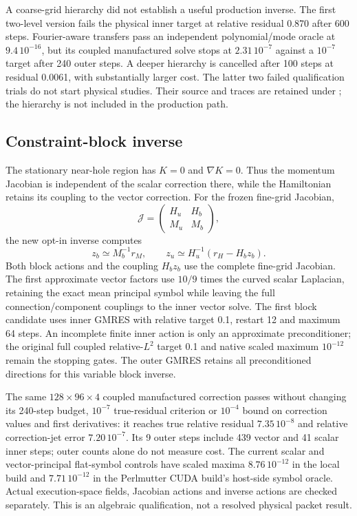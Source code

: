 \documentclass[aps,prd,preprint,notitlepage,nofootinbib]{revtex4-2}
\begin{document}
A coarse-grid hierarchy did not establish a useful production inverse.
The first two-level version fails the physical inner target at relative
residual 0.870 after 600 steps. Fourier-aware transfers pass an independent
polynomial/mode oracle at $9.4\,10^{-16}$, but its coupled manufactured
solve stops at $2.31\,10^{-7}$ against a $10^{-7}$ target after 240 outer
steps. A deeper hierarchy is cancelled after 100 steps at residual 0.0061,
with substantially larger cost. The latter two failed qualification trials
do not start physical studies. Their source and traces are retained under
; the hierarchy is not included
in the production path.

\subsection{Constraint-block inverse}
The stationary near-hole region has $K=0$ and $\nabla K=0$. Thus the
momentum Jacobian is independent of the scalar correction there, while the
Hamiltonian retains its coupling to the vector correction. For the frozen
fine-grid Jacobian,
\begin{equation}
\mathcal J=\begin{pmatrix}H_u&H_b\\M_u&M_b\end{pmatrix},
\end{equation}
the new opt-in inverse computes
\begin{equation}
z_b\simeq M_b^{-1}r_M,\qquad
z_u\simeq H_u^{-1}(r_H-H_bz_b).
\end{equation}
Both block actions and the coupling $H_bz_b$ use the complete fine-grid
Jacobian. The first approximate vector factors use $10/9$ times the curved
scalar Laplacian, retaining the exact mean principal symbol while leaving
the full connection/component couplings to the inner vector solve.
The first block candidate uses inner GMRES with relative target 0.1,
restart 12 and maximum 64 steps.
An incomplete finite inner action is only an approximate preconditioner;
the original full coupled relative-$L^2$ target 0.1 and native scaled
maximum $10^{-12}$ remain the stopping gates. The outer GMRES retains
all preconditioned directions for this variable block inverse.

The same $128\times96\times4$ coupled manufactured correction passes
without changing its 240-step budget, $10^{-7}$ true-residual criterion
or $10^{-4}$ bound on correction values and first derivatives: it reaches
true relative residual $7.35\,10^{-8}$ and relative correction-jet error
$7.20\,10^{-7}$. Its 9 outer steps include 439 vector and 41 scalar
inner steps; outer counts alone do not measure cost. The current scalar
and vector-principal flat-symbol controls have scaled maxima
$8.76\,10^{-12}$ in the local build and $7.71\,10^{-12}$ in the
Perlmutter CUDA build's host-side symbol oracle. Actual execution-space
fields, Jacobian actions and inverse actions are checked separately.
This is an algebraic qualification, not a resolved physical packet result.
\end{document}
